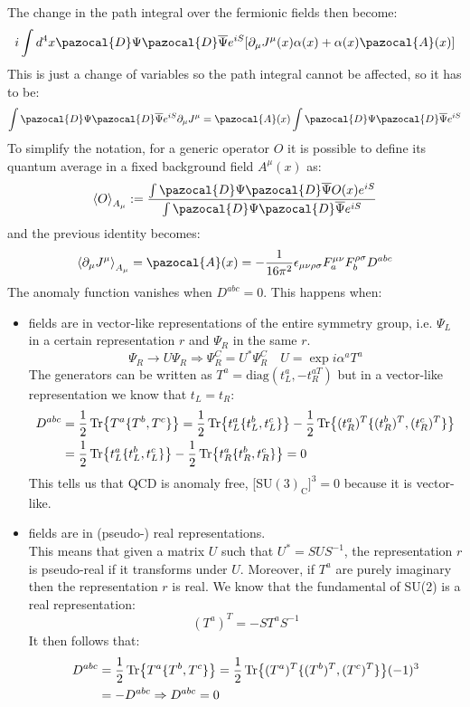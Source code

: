 \documentclass[../main.tex]{subfiles}
\begin{document}
The change in the path integral over the fermionic fields then become:
\[
i\int d^4x\pazocal{D}\Psi\pazocal{D}\overline{\Psi}e^{iS}[\partial_\mu J^{\mu}(x)\alpha(x)+\alpha(x)\pazocal{A}(x)]
\]
This is just a change of variables so the path integral cannot be affected, so it has to be:
\[
\int\pazocal{D}\Psi\pazocal{D}\overline{\Psi}e^{iS}\partial_\mu J^{\mu}=\pazocal{A}(x)\int\pazocal{D}\Psi\pazocal{D}\overline{\Psi}e^{iS}
\]
To simplify the notation, for a generic operator $O$ it is possible to define its quantum average in a fixed background field $A^\mu(x)$ as:
\[
\Braket{O}_{A_\mu}:=\frac{\int\pazocal{D}\Psi\pazocal{D}\overline{\Psi}O(x)e^{iS}}{\int \pazocal{D}\Psi\pazocal{D}\overline{\Psi}e^{iS}}
\]
and the previous identity becomes:
\[
\Braket{\partial_\mu J^\mu}_{A_\mu}=\pazocal{A}(x)=-\frac{1}{16\pi^2}\epsilon_{\mu\nu\rho\sigma}F^{\mu\nu}_aF^{\rho\sigma}_bD^{abc}
\]
The anomaly function vanishes when $D^{abc}=0$. This happens when:
\begin{itemize}
    \item fields are in vector-like representations of the entire symmetry group, i.e. $\Psi_L$ in a certain representation $r$ and $\Psi_R$ in the same $r$.
    \[
    \Psi_R\to U\Psi_R\Rightarrow\Psi_R^C=U^*\Psi_R^C \quad U=\exp{i\alpha^aT^a}
    \]
    The generators can be written as $T^a=\text{diag}(t_L^a, -t_R^{aT})$ but in a vector-like representation we know that $t_L=t_R$:
    \begin{align*}
    D^{abc}&=\frac{1}{2}\Tr{T^a\{T^b,T^c\}}=\frac{1}{2}\Tr{t_L^a\{t_L^b,t_L^c\}}-\frac{1}{2}\Tr{(t_R^a)^T\{(t_R^b)^T,(t_R^c)^T\}}\\
    &=\frac{1}{2}\Tr{t_L^a\{t_L^b,t_L^c\}}-\frac{1}{2}\Tr{t_R^a\{t_R^b,t_R^c\}}=0
    \end{align*}
    This tells us that QCD is anomaly free, [SU$(3)_{\text{C}}]^3=0$ because it is vector-like.
    \item fields are in (pseudo-) real representations.\\
    This means that given a matrix $U$ such that $U^*=SUS^{-1}$, the representation $r$ is pseudo-real if it transforms under $U$. Moreover, if $T^a$ are purely imaginary then the representation $r$ is real. We know that the fundamental of SU(2) is a real representation:
    \[
    (T^a)^T=-ST^aS^{-1}
    \]
    It then follows that:
    \begin{align*}
    D^{abc}&=\frac{1}{2}\Tr{T^a\{T^b,T^c\}}=\frac{1}{2}\Tr{(T^a)^T\{(T^b)^T,(T^c)^T\}}(-1)^3\\
    &=-D^{abc}\Rightarrow D^{abc}=0
    \end{align*}
\end{itemize}
\end{document}
